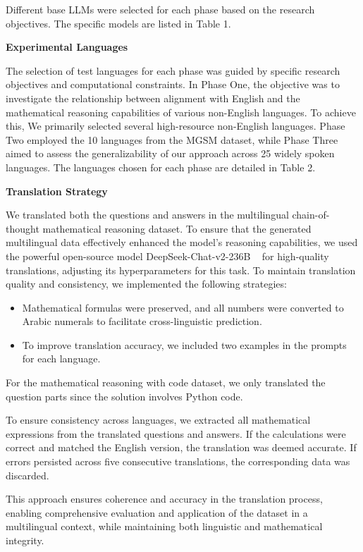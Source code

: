 \documentclass[11pt]{article}
\begin{document}
Different base LLMs were selected for each phase based on the research objectives. The specific models are listed in Table 1.

\textbf{Experimental Languages}

The selection of test languages for each phase was guided by specific research objectives and computational constraints. In Phase One, the objective was to investigate the relationship between alignment with English and the mathematical reasoning capabilities of various non-English languages. To achieve this, We primarily selected several high-resource non-English languages. Phase Two employed the 10 languages from the MGSM dataset, while Phase Three aimed to assess the generalizability of our approach across 25 widely spoken languages. The languages chosen for each phase are detailed in Table 2.



\textbf{Translation Strategy}

We translated both the questions and answers in the multilingual chain-of-thought mathematical reasoning dataset. To ensure that the generated multilingual data effectively enhanced the model's reasoning capabilities, we used the powerful open-source model DeepSeek-Chat-v2-236B ~\citep{deepseekv2} for high-quality translations, adjusting its hyperparameters for this task. To maintain translation quality and consistency, we implemented the following strategies:
\begin{itemize}
\item Mathematical formulas were preserved, and all numbers were converted to Arabic numerals to facilitate cross-linguistic prediction.
\item To improve translation accuracy, we included two examples in the prompts for each language.
\end{itemize}
For the mathematical reasoning with code dataset, we only translated the question parts since the solution involves Python code.

To ensure consistency across languages, we extracted all mathematical expressions from the translated questions and answers. If the calculations were correct and matched the English version, the translation was deemed accurate. If errors persisted across five consecutive translations, the corresponding data was discarded.

This approach ensures coherence and accuracy in the translation process, enabling comprehensive evaluation and application of the dataset in a multilingual context, while maintaining both linguistic and mathematical integrity.
\end{document}
